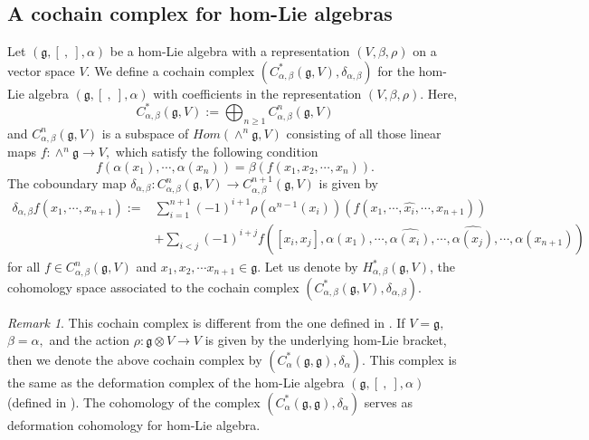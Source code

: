 \documentclass[a4paper,11pt]{amsart}
\theoremstyle{plain}
\theoremstyle{definition}
\theoremstyle{remark}
\newtheorem{remark}[theorem]{Remark}
\numberwithin{equation}{section}
\begin{document}
\subsection{A cochain complex for hom-Lie algebras}
Let $(\mathfrak{g},[~,~],\alpha)$ be a hom-Lie algebra with a representation $(V, \beta, \rho)$ on a vector space $V$. We define a cochain complex $(C^*_{\alpha,\beta}(\mathfrak{g},V),\delta_{\alpha,\beta})$ for the hom-Lie algebra $(\mathfrak{g},[~,~],\alpha)$ with coefficients in the representation $(V, \beta, \rho)$. Here, 
$$C^*_{\alpha,\beta}(\mathfrak{g},V):=\bigoplus_{n\geq 1}C^n_{\alpha,\beta}(\mathfrak{g},V)$$
and $C^n_{\alpha,\beta}(\mathfrak{g},V)$ is a subspace of $Hom(\wedge^n \mathfrak{g},V)$ consisting of all those linear maps $f:\wedge^n \mathfrak{g}\rightarrow V,$ which satisfy the following condition
$$f(\alpha(x_1),\cdots,\alpha(x_n))=\beta(f(x_1,x_2,\cdots,x_n)).$$
The coboundary map $\delta_{\alpha,\beta}:C^n_{\alpha,\beta}(\mathfrak{g},V)\rightarrow C^{n+1}_{\alpha,\beta}(\mathfrak{g},V)$ is given by 
\begin{equation}\label{coboundary:hom-Lie algebra}
\begin{split}
\delta_{\alpha,\beta} f(x_1,\cdots,x_{n+1}):= &\sum_{i=1}^{n+1}(-1)^{i+1}\rho(\alpha^{n-1}(x_i))(f(x_1,\cdots,\hat{x_i},\cdots,x_{n+1}))\\
&+\sum_{i<j} (-1)^{i+j}f([x_i,x_j],\alpha(x_1),\cdots,\hat{\alpha(x_i)},\cdots,\hat{\alpha(x_j)},\cdots,\alpha(x_{n+1}))
\end{split}
\end{equation}
for all $f\in C^n_{\alpha,\beta}(\mathfrak{g},V)$ and $x_1,x_2,\cdots x_{n+1}\in \mathfrak{g}$. Let us denote by $H^*_{\alpha,\beta}(\mathfrak{g},V)$, the cohomology space  associated to the cochain complex $(C^*_{\alpha,\beta}(\mathfrak{g},V),\delta_{\alpha,\beta})$. 

\begin{remark}
This cochain complex is different from the one defined in \cite{Sheng}. If $V=\mathfrak{g},$ $\beta=\alpha,$ and the action $\rho: \mathfrak{g}\otimes V\rightarrow V$ is given by the underlying hom-Lie bracket, then we denote the above cochain complex by $(C^*_{\alpha}(\mathfrak{g},\mathfrak{g}),\delta_{\alpha})$. This complex is the same as the deformation complex of the hom-Lie algebra $(\mathfrak{g},[~,~],\alpha)$ (defined in \cite{DefHLIE}). The cohomology of the complex $(C^*_{\alpha}(\mathfrak{g},\mathfrak{g}),\delta_{\alpha})$ serves as deformation cohomology for hom-Lie algebra.
\end{remark}
\end{document}
